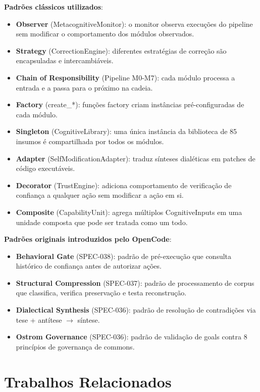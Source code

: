 \textbf{Padrões clássicos utilizados}:
\begin{itemize}
    \item \textbf{Observer} (MetacognitiveMonitor): o monitor observa execuções do pipeline sem modificar o comportamento dos módulos observados.
    \item \textbf{Strategy} (CorrectionEngine): diferentes estratégias de correção são encapsuladas e intercambiáveis.
    \item \textbf{Chain of Responsibility} (Pipeline M0-M7): cada módulo processa a entrada e a passa para o próximo na cadeia.
    \item \textbf{Factory} (create\_*): funções factory criam instâncias pré-configuradas de cada módulo.
    \item \textbf{Singleton} (CognitiveLibrary): uma única instância da biblioteca de 85 insumos é compartilhada por todos os módulos.
    \item \textbf{Adapter} (SelfModificationAdapter): traduz sínteses dialéticas em patches de código executáveis.
    \item \textbf{Decorator} (TrustEngine): adiciona comportamento de verificação de confiança a qualquer ação sem modificar a ação em si.
    \item \textbf{Composite} (CapabilityUnit): agrega múltiplos CognitiveInputs em uma unidade composta que pode ser tratada como um todo.
\end{itemize}

\textbf{Padrões originais introduzidos pelo OpenCode}:
\begin{itemize}
    \item \textbf{Behavioral Gate} (SPEC-038): padrão de pré-execução que consulta histórico de confiança antes de autorizar ações.
    \item \textbf{Structural Compression} (SPEC-037): padrão de processamento de corpus que classifica, verifica preservação e testa reconstrução.
    \item \textbf{Dialectical Synthesis} (SPEC-036): padrão de resolução de contradições via tese + antítese $\rightarrow$ síntese.
    \item \textbf{Ostrom Governance} (SPEC-036): padrão de validação de goals contra 8 princípios de governança de commons.
\end{itemize}

\section{Trabalhos Relacionados}

